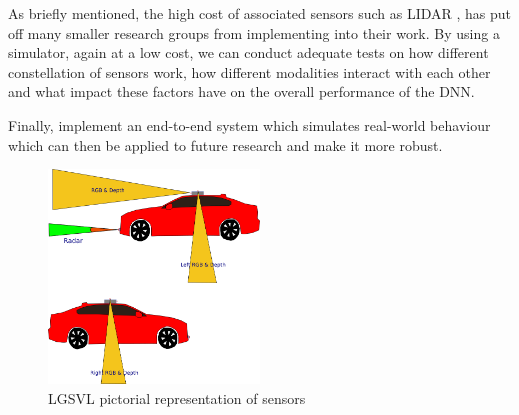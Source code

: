 As briefly mentioned, the high cost of associated sensors such as LIDAR
\cite{VergeReportLidar},  has put off many smaller research groups from implementing into their
work. By using a simulator, again at a low cost, we can conduct adequate tests 
on how different constellation of sensors work, how different modalities interact with each other and 
what impact these factors have on the overall performance of the DNN.

Finally, implement an end-to-end system which simulates real-world behaviour which can
then be applied to future research and make it more robust.

\begin{figure}[h]
    \begin{center}
        \includegraphics[width =0.5\textwidth]{figures/inkscape/jaguar_sensor_constellation.png}
    \end{center}
    \caption{LGSVL\cite{LGSVL} pictorial representation of sensors}
    \label{fig:LGSVL_sensor_distribution}
\end{figure}

